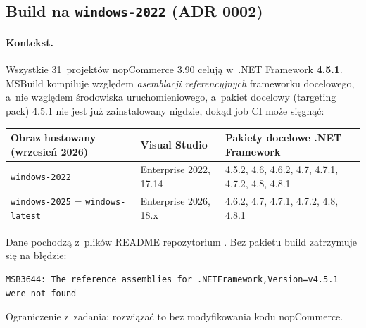 \subsection{Build na \texttt{windows-2022} (ADR 0002)}\label{sec:bench-build}

\paragraph{Kontekst.} Wszystkie 31~projektów nopCommerce 3.90 celują w~.NET Framework
\textbf{4.5.1}. MSBuild kompiluje względem \emph{asemblacji referencyjnych} frameworku
docelowego, a~nie względem środowiska uruchomieniowego, a~pakiet docelowy (targeting pack)
4.5.1 nie jest już zainstalowany nigdzie, dokąd job CI może sięgnąć:

\begin{center}
\small
\begin{tabularx}{\linewidth}{@{}>{\raggedright\arraybackslash}p{4.4cm} >{\raggedright\arraybackslash}p{3.4cm} X@{}}
\toprule
Obraz hostowany (wrzesień 2026) & Visual Studio & Pakiety docelowe .NET Framework \\
\midrule
\texttt{windows-2022} & Enterprise 2022, 17.14 & 4.5.2, 4.6, 4.6.2, 4.7, 4.7.1, 4.7.2,
  4.8, 4.8.1 \\
\texttt{windows-2025} = \texttt{windows-latest} & Enterprise 2026, 18.x & 4.6.2, 4.7,
  4.7.1, 4.7.2, 4.8, 4.8.1 \\
\bottomrule
\end{tabularx}
\end{center}

Dane pochodzą z~plików README repozytorium . Bez pakietu
build zatrzymuje się na błędzie:

\begin{lstlisting}
MSB3644: The reference assemblies for .NETFramework,Version=v4.5.1 were not found
\end{lstlisting}

Ograniczenie z~zadania: rozwiązać to bez modyfikowania kodu nopCommerce.

